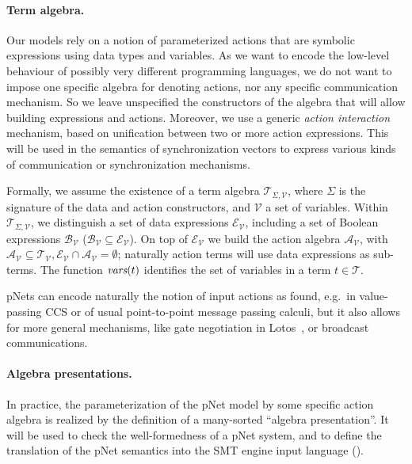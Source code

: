 \documentclass[smallcondensed]{svjour3}
\newcommand{\cT}{\ensuremath{\mathcal{T}}}
\newcommand{\cV}{\ensuremath{\mathcal{V}}}
\newcommand{\signature}{\ensuremath{\Sigma}}
\newcommand{\variables}{\ensuremath{\cV}}
\newcommand{\Talg}{\ensuremath{\cT_{\signature,\variables}}}
\def\AlgT{\mathcal{T}}
\newcommand{\eg}[1][\ ]{e.g.#1}
\begin{document}
\paragraph*{Term algebra.}
Our models rely on a notion of parameterized actions that are
symbolic expressions using data types and variables. As we want to encode
the low-level behaviour of possibly very different
programming languages, we do not want to impose one specific algebra
for denoting actions, nor any specific communication mechanism. So we
leave unspecified the constructors of the algebra that will allow building
expressions and actions. Moreover, we use a generic {\em action interaction}
mechanism, based on unification between two or more action
expressions. This will be used in the semantics of synchronization
vectors to express various kinds of communication or synchronization mechanisms.

\renewcommand{\P}{\mathcal V}
\def\Talg{\mathcal{T}_{\Sigma,\P}}
Formally, we assume the existence of a term algebra $\Talg$,
where $\Sigma$ is the signature of the data and action constructors,
and $\P$ a set of variables. Within $\Talg$, we distinguish a set of
data expressions $\mathcal{E}_\P$, including a set of Boolean
expressions $\mathcal{B}_{\P}$ ($\mathcal{B}_{\P}\subseteq\mathcal{E}_\P$).
On top of $\mathcal{E}_\P$ we build the action algebra
$\mathcal{A}_\P$, with $\mathcal{A}_\P\subseteq\mathcal{T}_\P,
\mathcal{E}_\P\cap\mathcal{A}_\P=\emptyset$;
naturally action terms will use data expressions as sub-terms.
The function $\vars(t)$ identifies the set of variables in a term
$t\in\AlgT$.

pNets can encode naturally the notion of input actions as found,
\eg in value-passing CCS 
\cite{Milner89} or of usual point-to-point message passing calculi,
but it also allows 
for more general mechanisms, like gate negotiation in Lotos~\cite{LotosISO89}, or broadcast
communications.

\paragraph*{Algebra presentations.}
In practice, the parameterization of the pNet model by some specific
action algebra is realized by the definition of a many-sorted ``algebra
presentation''. It will be used to check the
well-formedness of a pNet system, and to define the translation of the pNet
semantics into the SMT engine input language (\cite{BarFT-RR-17}).
\end{document}
